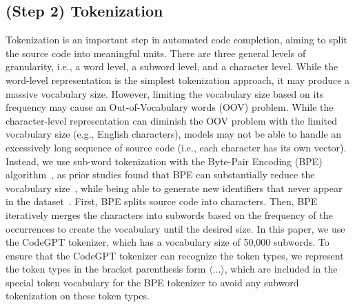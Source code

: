\subsection{(Step 2) Tokenization}
Tokenization is an important step in automated code completion, aiming to split the source code into meaningful units.
There are three general levels of granularity, i.e., a word level, a subword level, and a character level.
While the word-level representation is the simplest tokenization approach, it may produce a massive vocabulary size. 
However, limiting the vocabulary size based on its frequency may cause an Out-of-Vocabulary words (OOV) problem.
While the character-level representation can diminish the OOV problem with the limited vocabulary size (e.g., English characters), models may not be able to handle an excessively long sequence of source code (i.e., each character has its own vector).
Instead, we use sub-word tokenization with the Byte-Pair Encoding (BPE) algorithm~\cite{sennrich2015neural}, as prior studies found that BPE can substantially reduce the vocabulary size~\cite{fu2022gpt2sp, karampatsis2020big}, while being able to generate new identifiers that never appear in the dataset~\cite{thongtanunam2022autotransform}.
First, BPE splits source code into characters.
Then, BPE iteratively merges the characters into subwords based on the frequency of the occurrences to create the vocabulary until the desired size.
In this paper, we use the CodeGPT tokenizer, which has a vocabulary size of 50,000 subwords.
To ensure that the CodeGPT tokenizer can recognize the token types, we represent the token types in the bracket parenthesis form $\langle...\rangle$, which are included in the special token vocabulary for the BPE tokenizer to avoid any subword tokenization on these token types.






